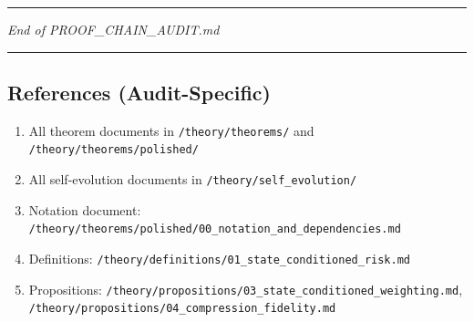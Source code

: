 \documentclass[
  12pt,
]{article}
\providecommand{\tightlist}{%
  \setlength{\itemsep}{0pt}\setlength{\parskip}{0pt}}
\begin{document}
\begin{center}\rule{0.5\linewidth}{0.5pt}\end{center}

\emph{End of PROOF\_CHAIN\_AUDIT.md}

\begin{center}\rule{0.5\linewidth}{0.5pt}\end{center}

\subsection{References
(Audit-Specific)}\label{references-audit-specific}

\begin{enumerate}
\def\labelenumi{\arabic{enumi}.}
\tightlist
\item
  All theorem documents in \texttt{/theory/theorems/} and
  \texttt{/theory/theorems/polished/}
\item
  All self-evolution documents in \texttt{/theory/self\_evolution/}
\item
  Notation document:
  \texttt{/theory/theorems/polished/00\_notation\_and\_dependencies.md}
\item
  Definitions:
  \texttt{/theory/definitions/01\_state\_conditioned\_risk.md}
\item
  Propositions:
  \texttt{/theory/propositions/03\_state\_conditioned\_weighting.md},
  \texttt{/theory/propositions/04\_compression\_fidelity.md}
\end{enumerate}
\end{document}
